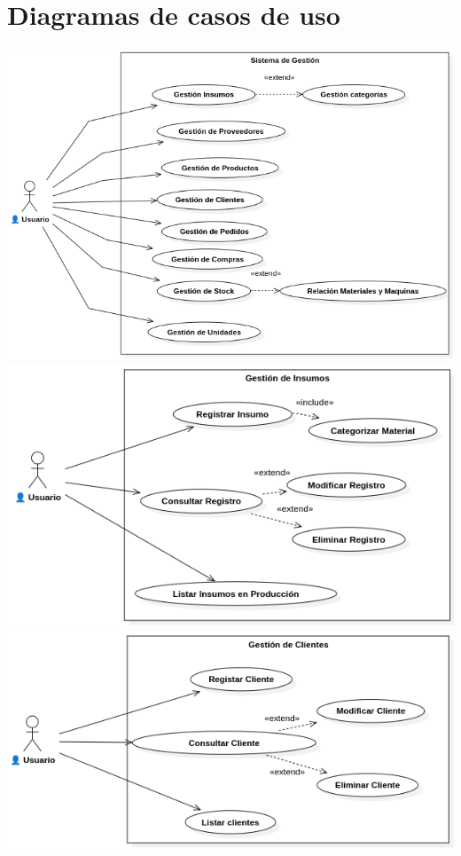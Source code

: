 \documentclass{article}
\begin{document}
\section{Diagramas de casos de uso}
	\begin{center}
		\includegraphics[width=1\linewidth]{imagenes/cu_sistema_de_gestion.png}
		\includegraphics[width=1\linewidth]{imagenes/cu_gestion_de_insumos.png}
		\includegraphics[width=1\linewidth]{imagenes/cu_gestion_clientes.png}

\end{center}
\end{document}
